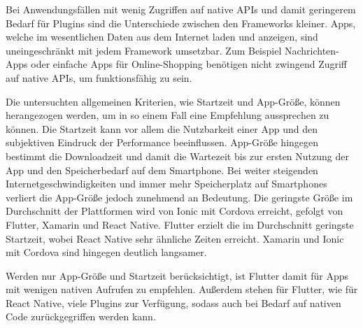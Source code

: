 Bei Anwendungsfällen mit wenig Zugriffen auf native \acp{API} und damit geringerem Bedarf für Plugins sind die Unterschiede zwischen den Frameworks kleiner.
Apps, welche im wesentlichen Daten aus dem Internet laden und anzeigen, sind uneingeschränkt mit jedem Framework umsetzbar.
Zum Beispiel Nachrichten-Apps oder einfache Apps für Online-Shopping benötigen nicht zwingend Zugriff auf native \acp{API}, um funktionsfähig zu sein.

Die untersuchten allgemeinen Kriterien, wie Startzeit und App-Größe, können herangezogen werden, um in so einem Fall eine Empfehlung aussprechen zu können.
Die Startzeit kann vor allem die Nutzbarkeit einer App und den subjektiven Eindruck der Performance beeinflussen.
App-Größe hingegen bestimmt die Downloadzeit und damit die Wartezeit bis zur ersten Nutzung der App und den Speicherbedarf auf dem Smartphone.
Bei weiter steigenden Internetgeschwindigkeiten und immer mehr Speicherplatz auf Smartphones verliert die App-Größe jedoch zunehmend an Bedeutung.
Die geringste Größe im Durchschnitt der Plattformen wird von Ionic mit Cordova erreicht, gefolgt von Flutter, Xamarin und React Native.
Flutter erzielt die im Durchschnitt geringste Startzeit, wobei React Native sehr ähnliche Zeiten erreicht.
Xamarin und Ionic mit Cordova sind hingegen deutlich langsamer.

Werden nur App-Größe und Startzeit berücksichtigt, ist Flutter damit für Apps mit wenigen nativen Aufrufen zu empfehlen.
Außerdem stehen für Flutter, wie für React Native, viele Plugins zur Verfügung, sodass auch bei Bedarf auf nativen Code zurückgegriffen werden kann.